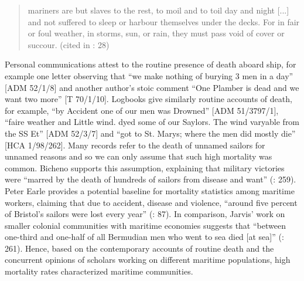\begin{quotation}
mariners are but slaves to the rest, to moil and to toil day and night [...] and not suffered to sleep or harbour themselves under the decks. For in fair or foul weather, in storms, sun, or rain, they must pass void of cover or succour. (cited in \citealt{Lavery2009}: 28) \end{quotation}

Personal communications attest to the routine presence of death aboard ship, for example one letter observing that “we make nothing of burying 3 men in a day” [ADM 52/1/8] and another author’s stoic comment “One Plamber is dead and we want two more” [T 70/1/10]. Logbooks give similarly routine accounts of death, for example, “by Accident one of our men was Drowned” [ADM 51/3797/1], “faire weather and Little wind. dyed some of our Saylors. The wind varyable from the SS Et” [ADM 52/3/7] and “got to St. Marys; where the men did mostly die” [HCA 1/98/262]. Many records refer to the death of unnamed sailors for unnamed reasons and so we can only assume that such high mortality was common. Bicheno supports this assumption, explaining that  military victories were “marred by the death of hundreds of sailors from disease and want” (\citealt{Bicheno2012}: 259). Peter Earle provides a potential baseline for mortality statistics among maritime workers, claiming that due to accident, disease and violence, “around five percent of Bristol’s sailors were lost every year” (\citealt{Earle1998}: 87). In comparison, Jarvis’ work on smaller colonial communities with maritime economies suggests that “between one-third and one-half of all Bermudian men who went to sea died [at sea]” (\citealt{Jarvis2010}: 261). Hence, based on the contemporary accounts of routine death and the concurrent opinions of scholars working on different maritime populations, high mortality rates characterized maritime communities. 

